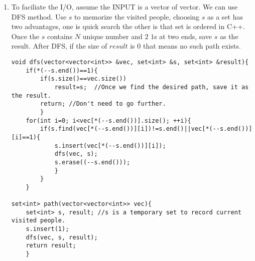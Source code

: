 \documentclass[10pt]{article}
\begin{document}
\begin{enumerate}
\item %
To faciliate the I/O, assume the INPUT is a vector of vector. We can use DFS method. Use $s$ to memorize the visited people, choosing $s$ as a set has two advantages, one is quick search the other is that set is ordered in C++. Once the $s$ contains $N$ unique number and $2$ $1$s at two ends, save $s$ as the result. After DFS, if the size of $result$ is $0$ that means no such path exists. 
\begin{lstlisting}
void dfs(vector<vector<int>> &vec, set<int> &s, set<int> &result){
    if(*(--s.end())==1){
        if(s.size()==vec.size())
            result=s;  //Once we find the desired path, save it as the result.
        return; //Don't need to go further.
        }
    for(int i=0; i<vec[*(--s.end())].size(); ++i){
        if(s.find(vec[*(--s.end())][i])!=s.end()||vec[*(--s.end())][i]==1){
            s.insert(vec[*(--s.end())][i]);   
            dfs(vec, s);
            s.erase((--s.end()));   
            }
        }
    }

set<int> path(vector<vector<int>> vec){
    set<int> s, result; //s is a temporary set to record current visited people.
    s.insert(1);
    dfs(vec, s, result);
    return result;
    }
\end{lstlisting}


\end{enumerate}
\end{document}
